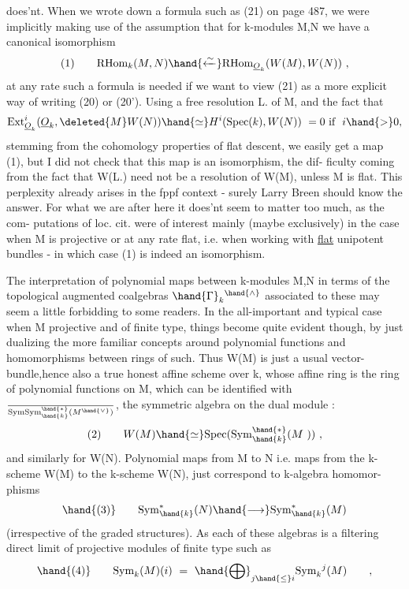 
does'nt.  When we wrote down a formula such as (21) on page 487,  we were
implicitly making use of the assumption that for k-modules M,N we have
a canonical isomorphism
\[ (1) \qquad \mathrm{RHom}_{k}(M,N) \hand{\xleftarrow{\sim}} \mathrm{RHom}_{\underline{O}_k}(W(M),W(N)) \ , \]
at any rate such a formula is needed if we want to view (21) as a more
explicit way of writing (20) or (20').  Using a free resolution L. of M,
and the fact that
\[ \mathrm{Ext}^{i}_{\underline{O}_k}(\underline{O}_k, \deleted{M} W(N)) \hand{\simeq} H^{i}(\mathrm{Spec}(k), W(N)) \ = 0 \ \text{if} \ \ i \hand{>} 0, \]
stemming from the cohomology properties of flat descent,  we easily get
a map (1),  but I did not check that this map is an isomorphism,  the dif-%
ficulty coming  from the fact that  W(L.)  need not be a resolution of
W(M),  unless M is flat.  This perplexity already arises in the fppf
context  -  surely Larry Breen should know the answer.  For what we are
 after here  it does'nt seem to  matter too much,  as the com-%
putations of loc. cit.  were of interest mainly (maybe exclusively) in the
case when M is projective or at any rate flat,  i.e. when working with
\uline{flat} unipotent bundles   -  in which case (1) is indeed an isomorphism.

The interpretation of polynomial maps between k-modules M,N  in terms
of the topological augmented coalgebras  $\hand{\Gamma}_k{}^{\hand{\wedge}}$ associated to these  may seem
a little forbidding to some readers.  In the all-important and typical
case when M   projective and of finite type,  things become quite evident
though,  by just dualizing the more familiar concepts around polynomial
functions and homomorphisms between rings of such.  Thus W(M) is just a
usual vector-bundle,hence also a true honest affine scheme over k,
whose affine ring is the ring of polynomial functions on M,  which can
be identified with  $\over{\mathrm{Sym}}{\mathrm{Sym}}^{\hand{*}}_{\hand{k}}(M^{\hand{\vee}})$,  the symmetric algebra on the dual module :
\[ (2) \qquad W(M) \hand{\simeq} \mathrm{Spec}(\mathrm{Sym}^{\hand{*}}_{\hand{k}}(M\ )) \ , \]
and similarly for W(N).  Polynomial maps from M to N i.e. maps from the
k-scheme W(M) to the k-scheme W(N),   just correspond to k-algebra homomor-%
phisms
\[ \hand{(3)} \qquad \mathrm{Sym}^{*}_{\hand{k}}(N) \hand{\longrightarrow} \mathrm{Sym}^{*}_{\hand{k}}(M) \]
(irrespective of the graded structures).  As each of these algebras is
a filtering direct limit of  projective modules of finite type such as
\[ \hand{(4)} \qquad \mathrm{Sym}_{k}(M)(i) \ = \ \hand{\bigoplus}_{j \hand{\leq} i} \mathrm{Sym}_{k}{}^{j}(M) \qquad , \]


